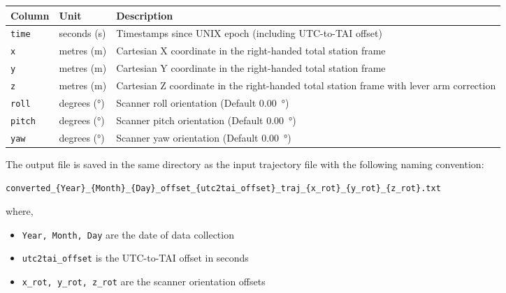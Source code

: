 \begin{table}[ht!]
    \centering
    \begin{tabularx}{\textwidth}{llX}
        \toprule
        Column         & Unit                     & Description                                                                              \\ \midrule
        \texttt{time}  & seconds (s)              & Timestamps since UNIX epoch (including UTC-to-TAI offset)                                \\
        \texttt{x}     & metres (m)               & Cartesian X coordinate in the right-handed total station frame                           \\
        \texttt{y}     & metres (m)               & Cartesian Y coordinate in the right-handed total station frame                           \\
        \texttt{z}     & metres (m)               & Cartesian Z coordinate in the right-handed total station frame with lever arm correction \\
        \texttt{roll}  & degrees (\unit{\degree}) & Scanner roll orientation (Default \qty{0.00}{\degree})                                   \\
        \texttt{pitch} & degrees (\unit{\degree}) & Scanner pitch orientation (Default \qty{0.00}{\degree})                                  \\
        \texttt{yaw}   & degrees (\unit{\degree}) & Scanner yaw orientation (Default \qty{0.00}{\degree})                                    \\
        \bottomrule
    \end{tabularx}
\end{table}

The output file is saved in the same directory as the input trajectory file with the following naming convention:

\begin{verbatim}
converted_{Year}_{Month}_{Day}_offset_{utc2tai_offset}_traj_{x_rot}_{y_rot}_{z_rot}.txt
\end{verbatim}

where,

\begin{itemize}
    \item \texttt{Year, Month, Day} are the date of data collection
    \item \texttt{utc2tai\_offset} is the UTC-to-TAI offset in seconds
    \item \texttt{x\_rot, y\_rot, z\_rot} are the scanner orientation offsets
\end{itemize}

